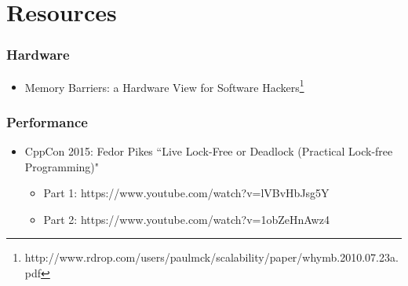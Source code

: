 \section{Resources}
\label{sec:res}

\begin{frame}
  \frametitle{Hardware}

  \begin{itemize}
  \item Memory Barriers: a Hardware View for Software Hackers\footnote{http://www.rdrop.com/users/paulmck/scalability/paper/whymb.2010.07.23a.pdf}
  \end{itemize}
\end{frame}

\begin{frame}
  \frametitle{Performance}

  \begin{itemize}
  \item CppCon 2015: Fedor Pikes “Live Lock-Free or Deadlock (Practical Lock-free Programming)"
    \begin{itemize}
    \item Part 1: https://www.youtube.com/watch?v=lVBvHbJsg5Y
    \item Part 2: https://www.youtube.com/watch?v=1obZeHnAwz4
    \end{itemize}
  \end{itemize}
\end{frame}

